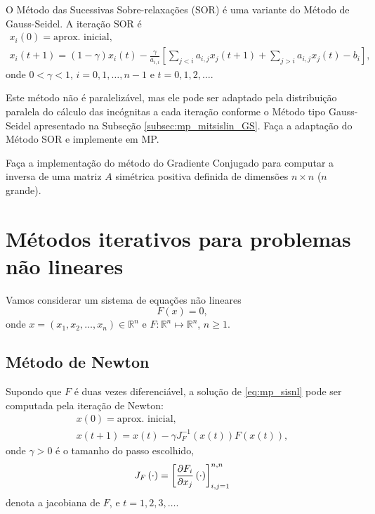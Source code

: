 \begin{exer}
  O Método das Sucessivas Sobre-relaxações (SOR) é uma variante do Método de Gauss-Seidel. A iteração SOR é
  \begin{gather}
    x_i(0) = \text{aprox. inicial},\\
    x_i(t+1) = (1-\gamma)x_i(t) - \frac{\gamma}{a_{i,i}}\left[\sum_{j<i}a_{i,j}x_j(t+1) + \sum_{j>i}a_{i,j}x_j(t) - b_i\right],
  \end{gather}
  onde $0<\gamma<1$, $i=0,1,\dotsc,n-1$ e $t=0,1,2,\ldots$.

  Este método não é paralelizável, mas ele pode ser adaptado pela distribuição paralela do cálculo das incógnitas a cada iteração conforme o Método tipo Gauss-Seidel apresentado na Subseção \ref{subsec:mp_mitsislin_GS}. Faça a adaptação do Método SOR e implemente em MP.
\end{exer}

\begin{exer}
  Faça a implementação do método do Gradiente Conjugado para computar a inversa de uma matriz $A$ simétrica positiva definida de dimensões $n\times n$ ($n$ grande).
\end{exer}

\section{Métodos iterativos para problemas não lineares}\label{cap_mp_sec_itnl}

Vamos considerar um sistema de equações não lineares
\begin{equation}\label{eq:mp_sisnl}
  F(x) = 0,
\end{equation}
onde $x=(x_1,x_2,\dotsc,x_n)\in\mathbb{R}^n$ e $F:\mathbb{R}^n\mapsto \mathbb{R}^n$, $n\geq 1$.

\subsection{Método de Newton}

Supondo que $F$ é duas vezes diferenciável, a solução de \eqref{eq:mp_sisnl} pode ser computada pela iteração de Newton:
\begin{gather}
  x(0) = \text{aprox. inicial},\\
  x(t+1) = x(t) - \gamma J_F^{-1}\left(x(t)\right)F\left(x(t)\right),\label{eq:mp_newton_iter0}
\end{gather}
onde $\gamma>0$ é o tamanho do passo escolhido, 
\begin{equation}
  J_F\left(\cdot\right) = \left[\frac{\partial F_i}{\partial x_j}\left(\cdot\right)\right]_{i,j=1}^{n,n}
\end{equation}
denota a jacobiana de $F$, e $t=1,2,3,\ldots$.

